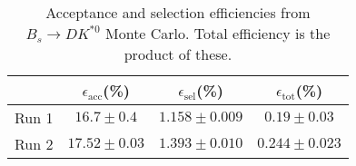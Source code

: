 \begin{table}
    \centering
    \begin{tabular}{cccc}
        \toprule
        & $\epsilon_\mathrm{acc}$(\%) &  $\epsilon_\mathrm{sel}$(\%) &  $\epsilon_\mathrm{tot}$(\%) \\
        \midrule
        Run 1 & $16.7 \pm 0.4$ & $1.158 \pm 0.009$ & $0.19 \pm 0.03$ \\
        Run 2 & $17.52 \pm 0.03$ & $1.393 \pm 0.010$ & $0.244 \pm 0.023$ \\
        \bottomrule
    \end{tabular}
    \caption{Acceptance and selection efficiencies from  $B_s \to DK^{*0}$ Monte Carlo. Total efficiency is the  product of these.}
\label{tab:selection_efficiency_Bs}
\end{table}
